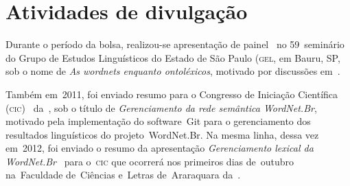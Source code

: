 \chapter{Atividades de divulgação}

Durante o período da bolsa, realizou-se apresentação de
painel~\cite{araujoetal} no 59\textordmasculine~seminário do Grupo de Estudos
Linguísticos do Estado de São Paulo (\textsc{gel}, em Bauru, SP, sob o nome de
\textit{As wordnets enquanto ontoléxicos}, motivado por discussões
em~.

Também em~2011, foi enviado resumo para o Congresso de Iniciação Científica
(\textsc{cic})~\cite{resumocic} da~\unesp, sob o título de
\textit{Gerenciamento da rede semântica WordNet.Br}, motivado pela
implementação do software~Git para o gerenciamento dos resultados linguísticos
do projeto~WordNet.Br. Na mesma linha, dessa vez em~2012, foi enviado o resumo
da apresentação \textit{Gerenciamento lexical da WordNet.Br}~\cite{resumocic2}
para o~\textsc{cic} que ocorrerá nos primeiros dias de~outubro na~Faculdade
de~Ciências e~Letras de~Araraquara da~\unesp.
